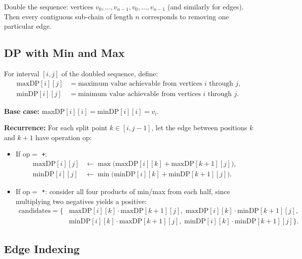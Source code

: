 \documentclass[11pt,a4paper]{article}
\begin{document}
Double the sequence: vertices $v_0, \ldots, v_{n-1}, v_0, \ldots, v_{n-1}$ (and
similarly for edges). Then every contiguous sub-chain of length $n$ corresponds to
removing one particular edge.

\subsection{DP with Min and Max}

For interval $[i, j]$ of the doubled sequence, define:
\begin{align*}
  \mathrm{maxDP}[i][j] &= \text{maximum value achievable from vertices } i \text{ through } j, \\
  \mathrm{minDP}[i][j] &= \text{minimum value achievable from vertices } i \text{ through } j.
\end{align*}

\textbf{Base case:} $\mathrm{maxDP}[i][i] = \mathrm{minDP}[i][i] = v_i$.

\textbf{Recurrence:} For each split point $k \in [i, j{-}1]$, let the edge between
positions $k$ and $k+1$ have operation $\mathrm{op}$:
\begin{itemize}
  \item If $\mathrm{op} = $ \texttt{+}:
    \begin{align*}
      \mathrm{maxDP}[i][j] &\gets \max\bigl(\mathrm{maxDP}[i][k] + \mathrm{maxDP}[k{+}1][j]\bigr), \\
      \mathrm{minDP}[i][j] &\gets \min\bigl(\mathrm{minDP}[i][k] + \mathrm{minDP}[k{+}1][j]\bigr).
    \end{align*}
  \item If $\mathrm{op} = $ \texttt{*}: consider all four products of min/max from each half,
    since multiplying two negatives yields a positive:
    \begin{align*}
      \text{candidates} = \{&\mathrm{maxDP}[i][k] \cdot \mathrm{maxDP}[k{+}1][j],\;
                             \mathrm{maxDP}[i][k] \cdot \mathrm{minDP}[k{+}1][j], \\
                            &\mathrm{minDP}[i][k] \cdot \mathrm{maxDP}[k{+}1][j],\;
                             \mathrm{minDP}[i][k] \cdot \mathrm{minDP}[k{+}1][j]\}.
    \end{align*}
\end{itemize}

\subsection{Edge Indexing}
\end{document}
